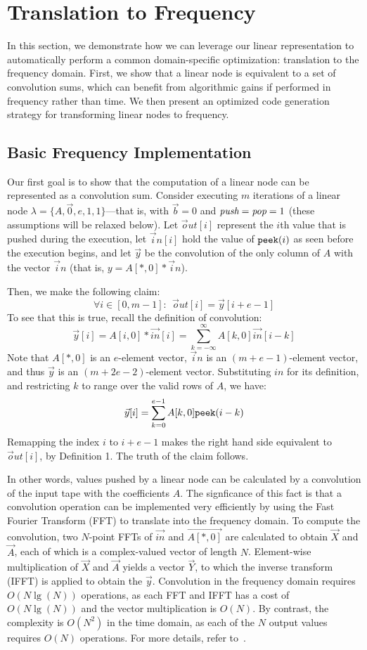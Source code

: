 \section{Translation to Frequency}
\label{sec:freq}

In this section, we demonstrate how we can leverage our linear
representation to automatically perform a common domain-specific
optimization: translation to the frequency domain.  First, we show
that a linear node is equivalent to a set of convolution sums, which
can benefit from algorithmic gains if performed in frequency rather
than time.  We then present an optimized code generation strategy for
transforming linear nodes to frequency.

\subsection{Basic Frequency Implementation}


Our first goal is to show that the computation of a linear node can be
represented as a convolution sum.  Consider executing $m$ iterations
of a linear node $\lambda = \{A, {\vec 0}, e, 1, 1\}$---that is, with
$\vec{b} = 0$ and $\mbox{\it push}=\mbox{\it pop}=1$ (these assumptions will be
relaxed below).  Let ${\vec out}[i]$ represent the $i$th value that is
pushed during the execution, let ${\vec in}[i]$ hold the value of
${\tt peek}(i)$ as seen before the execution begins, and let ${\vec
y}$ be the convolution of the only column of $A$ with the vector
${\vec in}$ (that is, $y = A[*,0] * {\vec in}$).

Then, we make the following claim:
\[
\forall i \in [0, m-1]:~~{\vec out}[i] = {\vec y}[i+e-1]
\]
To see that this is true, recall the definition of convolution:
\[
  {\vec y}[i] = A[i,0] * \vec{in}[i] = \sum_{k=-\infty}^{\infty} A[k,0] \vec{in}[i-k]
\]
Note that $A[*,0]$ is an $e$-element vector, ${\vec in}$ is an
$(m+e-1)$-element vector, and thus ${\vec y}$ is an $(m+2e-2)$-element
vector.  Substituting $in$ for its definition, and restricting $k$ to
range over the valid rows of $A$, we have:
\[
  {\vec y}[i] = \sum_{k=0}^{e-1} A[k,0] {\tt peek}(i-k)
\]
Remapping the index $i$ to $i+e-1$ makes the right hand side
equivalent to ${\vec out}[i]$, by Definition 1.  The truth of the
claim follows.

In other words, values pushed by a linear node can be calculated by a
convolution of the input tape with the coefficients $A$.  The
signficance of this fact is that a convolution operation can be
implemented very efficiently by using the Fast Fourier Transform (FFT)
to translate into the frequency domain.  To compute the convolution,
two $N$-point FFTs of $\vec{in}$ and $\vec{A[*,0]}$ are calculated to
obtain $\vec{X}$ and $\vec{A}$, each of which is a complex-valued
vector of length $N$.  Element-wise multiplication of $\vec{X}$ and
$\vec{A}$ yields a vector $\vec{Y}$, to which the inverse transform
(IFFT) is applied to obtain the $\vec{y}$.  Convolution in the
frequency domain requires $O(N \lg(N))$ operations, as each FFT and
IFFT has a cost of $O(N \lg (N))$ and the vector multiplication is
$O(N)$.  By contrast, the complexity is $O(N^2)$ in the time domain,
as each of the $N$ output values requires $O(N)$ operations.  For more
details, refer to~\cite{oppenheim-discrete}.

